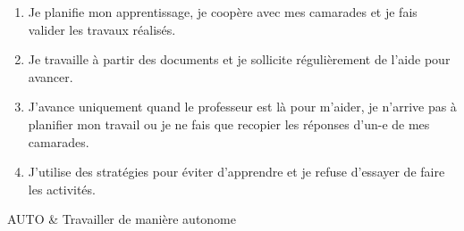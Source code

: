 

\begin{enumerate}[label = \Alph*]
  \item Je planifie mon apprentissage, je coopère avec mes camarades et je fais valider les travaux réalisés.
  \item Je travaille à partir des documents et je sollicite régulièrement de l'aide pour avancer.
  \item J'avance uniquement quand le professeur est là pour m'aider, je n'arrive pas à planifier mon travail ou je ne fais que recopier les réponses d'un-e de mes camarades.
  \item J'utilise des stratégies pour éviter d'apprendre et je refuse d'essayer de faire les activités.
\end{enumerate}

\begin{tableauCompetences}
  AUTO & Travailler de manière autonome \\
\end{tableauCompetences}